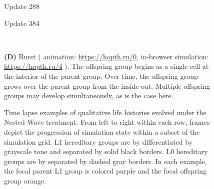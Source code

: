 \begin{figure*}[!htbp]
\begin{center}
\begin{minipage}[b]{\textwidth}
\begin{minipage}[t]{0.18\textwidth}
{\footnotesize Update 288}
\end{minipage}
\begin{minipage}[t]{0.18\textwidth}
\centering
{}
{\footnotesize Update 384}
\end{minipage}\\
\begin{minipage}{\textwidth}
\dissertationonly{\footnotesize}
\textbf{(D)} Burst
(%
animation: \url{https://hopth.ru/0},
in-browser simulation: \url{https://hopth.ru/4}%
).
The offspring group begins as a single cell at the interior of the parent group.
Over time, the offspring group grows over the parent group from the inside out.
Multiple offspring groups may develop simultaneously, as is the case here.
\end{minipage}
\end{minipage}

\caption{
Time lapse examples of qualitative life histories evolved under the Nested-Wave treatment.
From left to right within each row, frames depict the progression of simulation state within a subset of the simulation grid.
L1 hereditary groups are by differentiated by grayscale tone and separated by solid black borders.
L0 hereditary groups are by separated by dashed gray borders.
In each example, the focal parent L1 group is colored purple and the focal offspring group orange.
}
\label{fig:lifecycle}
\end{center}
\end{figure*}
